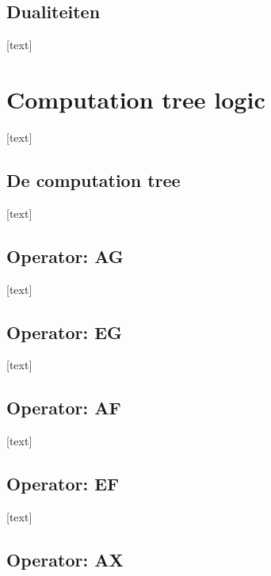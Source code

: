 \documentclass{article}
\begin{document}
		
		\subsection{Dualiteiten}
		
		[text]
	
	\newpage
	
	
	\section{Computation tree logic}
	
	[text]
		
		\subsection{De computation tree}
				
		[text]
		
		\subsection{Operator: AG}
				
		[text]
		
		\subsection{Operator: EG}
				
		[text]
		
		\subsection{Operator: AF}
				
		[text]
		
		\subsection{Operator: EF}
				
		[text]
		
		\subsection{Operator: AX}
				
\end{document}

